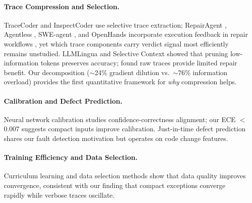 \paragraph{Trace Compression and Selection.}
TraceCoder \citep{huang2026tracecoder} and InspectCoder \citep{wang2025inspectcoder} use selective trace extraction; RepairAgent \citep{bouzenia2025repairagent}, Agentless \citep{xia2024agentless}, SWE-agent \citep{yang2024sweagent}, and OpenHands \citep{wang2025openhands} incorporate execution feedback in repair workflows \citep{jimenez2024swebench}, yet which trace components carry verdict signal most efficiently remains unstudied.
LLMLingua \citep{jiang2023llmlingua} and Selective Context \citep{li2023selectivecontext} showed that pruning low-information tokens preserves accuracy; \citet{haque2025traces} found raw traces provide limited repair benefit.
Our decomposition (${\sim}$24\% gradient dilution vs.\ ${\sim}$76\% information overload) provides the first quantitative framework for \emph{why} compression helps.

\paragraph{Calibration and Defect Prediction.}
Neural network calibration \citep{guo2017calibration,kadavath2022language,spiess2025calibration} studies confidence-correctness alignment; our ECE ${<}$ 0.007 suggests compact inputs improve calibration. Just-in-time defect prediction \citep{kamei2013large,hoang2019deepjit} shares our fault detection motivation but operates on code change features.

\paragraph{Training Efficiency and Data Selection.}
Curriculum learning \citep{bengio2009curriculum} and data selection methods \citep{swayamdipta2020cartography,sachdeva2024dataefficient} show that data quality improves convergence, consistent with our finding that compact exceptions converge rapidly while verbose traces oscillate.

